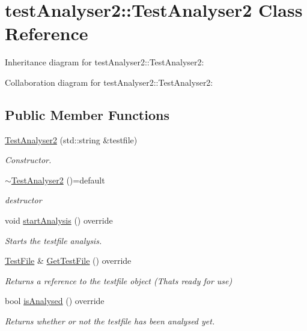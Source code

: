 \hypertarget{classtestAnalyser2_1_1TestAnalyser2}{}\section{test\+Analyser2\+::Test\+Analyser2 Class Reference}
\label{classtestAnalyser2_1_1TestAnalyser2}


Inheritance diagram for test\+Analyser2\+::Test\+Analyser2\+:


Collaboration diagram for test\+Analyser2\+::Test\+Analyser2\+:
\subsection*{Public Member Functions}
\begin{DoxyCompactItemize}
\item 
\mbox{\hyperlink{classtestAnalyser2_1_1TestAnalyser2_ab5574c95c9f440a8b640afc30956184f}{Test\+Analyser2}} (std\+::string \&testfile)
\begin{DoxyCompactList}\small\item\em Constructor. \end{DoxyCompactList}\item 
\mbox{\label{classtestAnalyser2_1_1TestAnalyser2_a7724d2661b5babd73bc78516238cca46}} 
\mbox{\hyperlink{classtestAnalyser2_1_1TestAnalyser2_a7724d2661b5babd73bc78516238cca46}{$\sim$\+Test\+Analyser2}} ()=default
\begin{DoxyCompactList}\small\item\em destructor \end{DoxyCompactList}\item 
void \mbox{\hyperlink{classtestAnalyser2_1_1TestAnalyser2_a919e5ac56e1bc71dcd2d9bc7e4213125}{start\+Analysis}} () override
\begin{DoxyCompactList}\small\item\em Starts the testfile analysis. \end{DoxyCompactList}\item 
\mbox{\hyperlink{classtestAnalyser2_1_1TestFile}{Test\+File}} \& \mbox{\hyperlink{classtestAnalyser2_1_1TestAnalyser2_ab90ac14da653b04877d4f07698faf372}{Get\+Test\+File}} () override
\begin{DoxyCompactList}\small\item\em Returns a reference to the testfile object (That\textquotesingle{}s ready for use) \end{DoxyCompactList}\item 
bool \mbox{\hyperlink{classtestAnalyser2_1_1TestAnalyser2_adc5a43d9fea5357959b1509af82a8580}{is\+Analysed}} () override
\begin{DoxyCompactList}\small\item\em Returns whether or not the testfile has been analysed yet. \end{DoxyCompactList}\end{DoxyCompactItemize}


